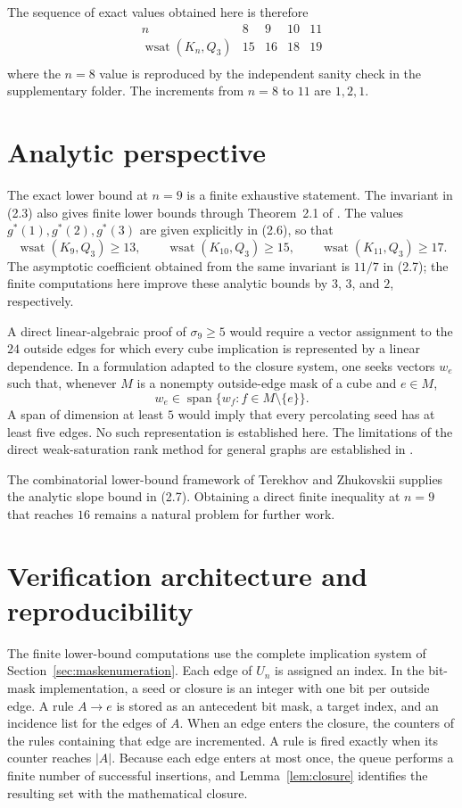 \documentclass[11pt]{article}
\numberwithin{equation}{section}
\newcommand{\wsat}{\operatorname{wsat}}
\begin{document}
The sequence of exact values obtained here is therefore
\[
\begin{array}{c|cccc}
n&8&9&10&11\\ \hline
\wsat(K_n,Q_3)&15&16&18&19\\
\end{array}
\tag{7.3}
\]
where the $n=8$ value is reproduced by the independent sanity check in the supplementary folder. The increments from $n=8$ to $11$ are $1,2,1$.

\section{Analytic perspective}\label{sec:analytic}
The exact lower bound at $n=9$ is a finite exhaustive statement. The invariant in (2.3) also gives finite lower bounds through Theorem~2.1 of \cite{TZ2025}. The values $g^*(1),g^*(2),g^*(3)$ are given explicitly in (2.6), so that
\[
\wsat(K_9,Q_3)\ge13,\qquad
\wsat(K_{10},Q_3)\ge15,\qquad
\wsat(K_{11},Q_3)\ge17.
\]
The asymptotic coefficient obtained from the same invariant is $11/7$ in (2.7); the finite computations here improve these analytic bounds by $3$, $3$, and $2$, respectively.

A direct linear-algebraic proof of $\sigma_9\ge5$ would require a vector assignment to the $24$ outside edges for which every cube implication is represented by a linear dependence. In a formulation adapted to the closure system, one seeks vectors $w_e$ such that, whenever $M$ is a nonempty outside-edge mask of a cube and $e\in M$,
\[
w_e\in\operatorname{span}\{w_f:f\in M\setminus\{e\}\}.
\]
A span of dimension at least $5$ would imply that every percolating seed has at least five edges. No such representation is established here. The limitations of the direct weak-saturation rank method for general graphs are established in \cite{TZrank2025}.

The combinatorial lower-bound framework of Terekhov and Zhukovskii supplies the analytic slope bound in (2.7). Obtaining a direct finite inequality at $n=9$ that reaches $16$ remains a natural problem for further work.

\section{Verification architecture and reproducibility}\label{sec:repro}
The finite lower-bound computations use the complete implication system of
Section~\ref{sec:maskenumeration}. Each edge of $U_n$ is assigned an index. In
the bit-mask implementation, a seed or closure is an integer with one bit per
outside edge. A rule $A\to e$ is stored as an antecedent bit mask, a target
index, and an incidence list for the edges of $A$. When an edge enters the
closure, the counters of the rules containing that edge are incremented. A
rule is fired exactly when its counter reaches $|A|$. Because each edge enters
at most once, the queue performs a finite number of successful insertions, and
Lemma~\ref{lem:closure} identifies the resulting set with the mathematical
closure.
\end{document}
